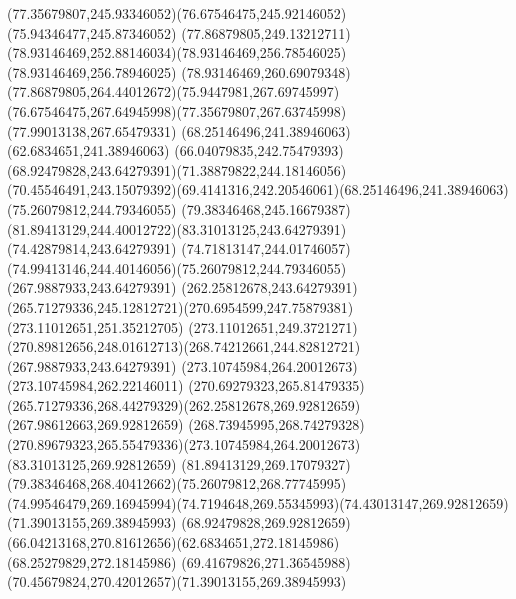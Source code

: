 {{		\curveto(77.35679807,245.93346052)(76.67546475,245.92146052)(75.94346477,245.87346052)
		\curveto(77.86879805,249.13212711)(78.93146469,252.88146034)(78.93146469,256.78546025)
		\lineto(78.93146469,256.78946025)
		\curveto(78.93146469,260.69079348)(77.86879805,264.44012672)(75.9447981,267.69745997)
		\curveto(76.67546475,267.64945998)(77.35679807,267.63745998)(77.99013138,267.65479331)
		\moveto(68.25146496,241.38946063)
		\lineto(62.6834651,241.38946063)
		\curveto(66.04079835,242.75479393)(68.92479828,243.64279391)(71.38879822,244.18146056)
		\curveto(70.45546491,243.15079392)(69.4141316,242.20546061)(68.25146496,241.38946063)
		\moveto(75.26079812,244.79346055)
		\curveto(79.38346468,245.16679387)(81.89413129,244.40012722)(83.31013125,243.64279391)
		\lineto(74.42879814,243.64279391)
		\curveto(74.71813147,244.01746057)(74.99413146,244.40146056)(75.26079812,244.79346055)
		\moveto(267.9887933,243.64279391)
		\lineto(262.25812678,243.64279391)
		\curveto(265.71279336,245.12812721)(270.6954599,247.75879381)(273.11012651,251.35212705)
		\lineto(273.11012651,249.3721271)
		\curveto(270.89812656,248.01612713)(268.74212661,244.82812721)(267.9887933,243.64279391)
		\moveto(273.10745984,264.20012673)
		\lineto(273.10745984,262.22146011)
		\curveto(270.69279323,265.81479335)(265.71279336,268.44279329)(262.25812678,269.92812659)
		\lineto(267.98612663,269.92812659)
		\curveto(268.73945995,268.74279328)(270.89679323,265.55479336)(273.10745984,264.20012673)
		\moveto(83.31013125,269.92812659)
		\curveto(81.89413129,269.17079327)(79.38346468,268.40412662)(75.26079812,268.77745995)
		\curveto(74.99546479,269.16945994)(74.7194648,269.55345993)(74.43013147,269.92812659)
		\closepath
		\moveto(71.39013155,269.38945993)
		\curveto(68.92479828,269.92812659)(66.04213168,270.81612656)(62.6834651,272.18145986)
		\lineto(68.25279829,272.18145986)
		\curveto(69.41679826,271.36545988)(70.45679824,270.42012657)(71.39013155,269.38945993)
	}
}

